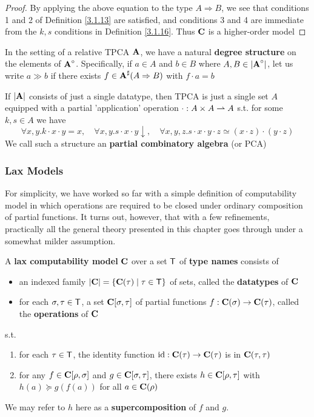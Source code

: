 \documentclass[11pt]{article}
\begin{document}
\begin{proof}
By applying the above equation to the type \(A\Rightarrow B\), we see that conditions 1 and 2 of
Definition \ref{3.1.13} are satisfied, and conditions 3 and 4 are immediate from the \(k,s\)
conditions in Definition \ref{3.1.16}. Thus \(\operatorname{\textbf{C}}\) is a higher-order model
\end{proof}

In the setting of a relative TPCA \(\operatorname{\textbf{A}}\), we have a natural \textbf{degree structure} on the elements
of \(\operatorname{\textbf{A}}^\circ\). Specifically, if \(a\in A\) and \(b\in B\) where \(A,B\in\abs{\bA^\circ}\), let us
write \(a\gg b\) if there exists \(f\in\operatorname{\textbf{A}}^\sharp(A\Rightarrow B)\) with \(f\cdot a=b\)

If \(\abs{\bA}\) consists of just a single datatype, then TPCA is just a single set \(A\) equipped
with a partial 'application' operation \(\cdot:A\times A\rightharpoonup A\) s.t. for some \(k,s\in A\) we have
\begin{equation*}
\forall x,y.k\cdot x\cdot y=x,\quad\forall x,y.s\cdot x\cdot y\downarrow,\quad\forall x,y,z.s\cdot x\cdot y\cdot z\simeq(x\cdot z)\cdot(y\cdot z)
\end{equation*}
We call such a structure an \textbf{partial combinatory algebra} (or PCA)
\subsubsection{Lax Models}
\label{sec:orgf2e2871}
For simplicity, we have worked so far with a simple definition of computability model in which
operations are required to be closed under ordinary composition of partial functions. It turns
out, however, that with a few refinements, practically all the general theory presented in this
chapter goes through under a somewhat milder assumption.

\begin{definition}[]
A \textbf{lax computability model} \(\operatorname{\textbf{C}}\)  over a set \(\textsf{T}\) of \textbf{type names} consists of
\begin{itemize}
\item an indexed family \(\abs{\bC}=\{\bC(\tau)\mid\tau\in\sfT\}\) of sets, called the \textbf{datatypes} of \(\operatorname{\textbf{C}}\)
\item for each \(\sigma,\tau\in\textsf{T}\), a set \(\operatorname{\textbf{C}}[\sigma,\tau]\) of partial functions \(f:\operatorname{\textbf{C}}(\sigma)\to\operatorname{\textbf{C}}(\tau)\), called the
\textbf{operations} of \(\operatorname{\textbf{C}}\)
\end{itemize}


s.t.
\begin{enumerate}
\item for each \(\tau\in\textsf{T}\), the identity function \(\operatorname{id}:\operatorname{\textbf{C}}(\tau)\to\operatorname{\textbf{C}}(\tau)\) is in \(\operatorname{\textbf{C}}(\tau,\tau)\)
\item for any \(f\in\operatorname{\textbf{C}}[\rho,\sigma]\) and \(g\in\operatorname{\textbf{C}}[\sigma,\tau]\), there exists \(h\in\operatorname{\textbf{C}}[\rho,\tau]\) with \(h(a)\succeq g(f(a))\) for
all \(a\in\operatorname{\textbf{C}}(\rho)\)
\end{enumerate}


We may refer to \(h\) here as a \textbf{supercomposition} of \(f\) and \(g\).
\end{definition}
\end{document}
